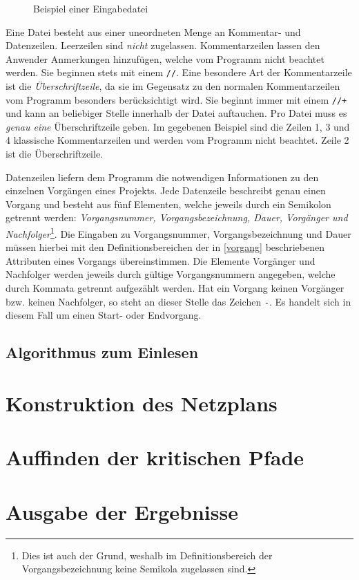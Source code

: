 \begin{figure}[h!]
  \fbox{
    \setlength{\fboxrule}{1pt}
    
  }
  \caption{Beispiel einer Eingabedatei}
\end{figure}
Eine Datei besteht aus einer uneordneten Menge an Kommentar- und
Datenzeilen. Leerzeilen sind \textit{nicht}
zugelassen. Kommentarzeilen lassen den Anwender Anmerkungen
hinzuf\"ugen, welche vom Programm nicht beachtet werden. Sie beginnen
stets mit einem \texttt{//}. Eine besondere Art der Kommentarzeile ist
die \textit{\"Uberschriftzeile}, da sie im Gegensatz zu den normalen
Kommentarzeilen vom Programm besonders ber\"ucksichtigt wird. Sie
beginnt immer mit einem \texttt{//+} und kann an beliebiger Stelle
innerhalb der Datei auftauchen. Pro Datei muss es \textit{genau eine}
\"Uberschriftzeile geben. Im gegebenen Beispiel sind die Zeilen 1, 3
und 4 klassische Kommentarzeilen und werden vom Programm nicht
beachtet. Zeile 2 ist die \"Uberschriftzeile.

Datenzeilen liefern dem Programm die notwendigen Informationen zu den
einzelnen Vorg\"angen eines Projekts. Jede Datenzeile beschreibt genau
einen Vorgang und besteht aus f\"unf Elementen, welche jeweils durch
ein Semikolon getrennt werden: \textit{Vorgangsnummer,
  Vorgangsbezeichnung, Dauer, Vorg\"anger und
  Nachfolger}\footnote{Dies ist auch der Grund, weshalb im
  Definitionsbereich der Vorgangsbezeichnung keine Semikola zugelassen
  sind.}.
Die Eingaben zu Vorgangsnummer, Vorgangsbezeichnung und Dauer m\"ussen
hierbei mit den Definitionsbereichen der in \ref{vorgang} beschriebenen Attributen
eines Vorgangs \"ubereinstimmen. Die Elemente Vorg\"anger und
Nachfolger werden jeweils durch g\"ultige Vorgangsnummern angegeben,
welche durch Kommata getrennt aufgez\"ahlt werden. Hat ein Vorgang
keinen Vorg\"anger bzw. keinen Nachfolger, so steht an dieser Stelle
das Zeichen \texttt{-}. Es handelt sich in diesem Fall um einen Start-
oder Endvorgang.

\subsection{Algorithmus zum Einlesen}

\section{Konstruktion des Netzplans}

\section{Auffinden der kritischen Pfade}

\section{Ausgabe der Ergebnisse}
